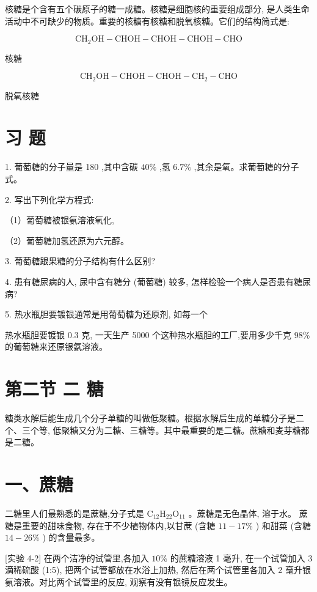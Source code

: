 \documentclass[10pt]{article}
\begin{document}
核糖是个含有五个碳原子的糖一成糖。核糖是细胞核的重要组成部分, 是人类生命活动中不可缺少的物质。重要的核糖有核糖和脱氧核糖。它们的结构简式是:

\[
{\mathrm{{CH}}}_{2}\mathrm{{OH}} - \mathrm{{CHOH}} - \mathrm{{CHOH}} - \mathrm{{CHOH}} - \mathrm{{CHO}}
\]

核糖

\[
{\mathrm{{CH}}}_{2}\mathrm{{OH}} - \mathrm{{CHOH}} - \mathrm{{CHOH}} - {\mathrm{{CH}}}_{2} - \mathrm{{CHO}}
\]

脱氧核糖

\section*{习 题}

1. 葡萄糖的分子量是 180 ,其中含碳 \({40}\%\) ,氢 \({6.7}\%\) ,其余是氧。求葡萄糖的分子式。

2. 写出下列化学方程式:

（1）葡萄糖被银氨溶液氧化,

（2）葡萄糖加氢还原为六元醇。

3. 葡萄糖跟果糖的分子结构有什么区别?

4. 患有糖尿病的人, 尿中含有糖分 (葡萄糖) 较多, 怎样检验一个病人是否患有糖尿病?

5. 热水瓶胆要镀银通常是用葡萄糖为还原剂, 如每一个

热水瓶胆要镀银 0.3 克, 一天生产 5000 个这种热水瓶胆的工厂,要用多少千克 \({98}\%\) 的葡萄糖来还原银氨溶液。

\section*{第二节 二 糖}

糖类水解后能生成几个分子单糖的叫做低聚糖。根据水解后生成的单糖分子是二个、三个等, 低聚糖又分为二糖、三糖等。其中最重要的是二糖。蔗糖和麦芽糖都是二糖。

\section*{一、蔗糖}

二糖里人们最熟悉的是蔗糖,分子式是 \({\mathrm{C}}_{12}{\mathrm{H}}_{22}{\mathrm{O}}_{11}\) 。蔗糖是无色晶体, 溶于水。 蔗糖是重要的甜味食物, 存在于不少植物体内,以甘蔗 (含糖 \({11} - {17}\%\) ) 和甜菜 (含糖 \({14} - {26}\%\) ) 的含量最多。

[实验 4-2] 在两个洁净的试管里,各加入 \({10}\%\) 的蔗糖溶液 1 毫升, 在一个试管加入 3 滴稀硫酸 (1:5), 把两个试管都放在水浴上加热, 然后在两个试管里各加入 2 毫升银氨溶液。对比两个试管里的反应, 观察有没有银镜反应发生。
\end{document}
